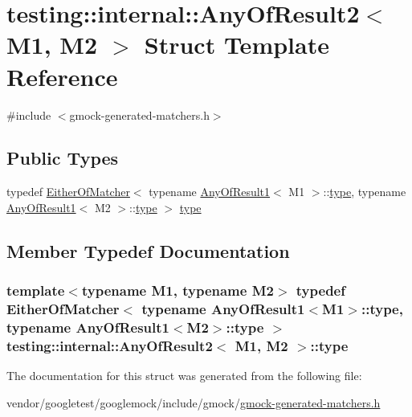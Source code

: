 \hypertarget{structtesting_1_1internal_1_1AnyOfResult2}{}\section{testing\+:\+:internal\+:\+:Any\+Of\+Result2$<$ M1, M2 $>$ Struct Template Reference}
\label{structtesting_1_1internal_1_1AnyOfResult2}


{\ttfamily \#include $<$gmock-\/generated-\/matchers.\+h$>$}

\subsection*{Public Types}
\begin{DoxyCompactItemize}
\item 
typedef \hyperlink{classtesting_1_1internal_1_1EitherOfMatcher}{Either\+Of\+Matcher}$<$ typename \hyperlink{structtesting_1_1internal_1_1AnyOfResult1}{Any\+Of\+Result1}$<$ M1 $>$\+::\hyperlink{structtesting_1_1internal_1_1AnyOfResult2_a6d9eba508021f8e652c7c154a649073f}{type}, typename \hyperlink{structtesting_1_1internal_1_1AnyOfResult1}{Any\+Of\+Result1}$<$ M2 $>$\+::\hyperlink{structtesting_1_1internal_1_1AnyOfResult2_a6d9eba508021f8e652c7c154a649073f}{type} $>$ \hyperlink{structtesting_1_1internal_1_1AnyOfResult2_a6d9eba508021f8e652c7c154a649073f}{type}
\end{DoxyCompactItemize}


\subsection{Member Typedef Documentation}
\subsubsection[{\texorpdfstring{type}{type}}]{\setlength{\rightskip}{0pt plus 5cm}template$<$typename M1, typename M2$>$ typedef {\bf Either\+Of\+Matcher}$<$ typename {\bf Any\+Of\+Result1}$<$M1$>$\+::{\bf type}, typename {\bf Any\+Of\+Result1}$<$M2$>$\+::{\bf type} $>$ {\bf testing\+::internal\+::\+Any\+Of\+Result2}$<$ M1, M2 $>$\+::{\bf type}}\hypertarget{structtesting_1_1internal_1_1AnyOfResult2_a6d9eba508021f8e652c7c154a649073f}{}\label{structtesting_1_1internal_1_1AnyOfResult2_a6d9eba508021f8e652c7c154a649073f}


The documentation for this struct was generated from the following file\+:\begin{DoxyCompactItemize}
\item 
vendor/googletest/googlemock/include/gmock/\hyperlink{gmock-generated-matchers_8h}{gmock-\/generated-\/matchers.\+h}\end{DoxyCompactItemize}
